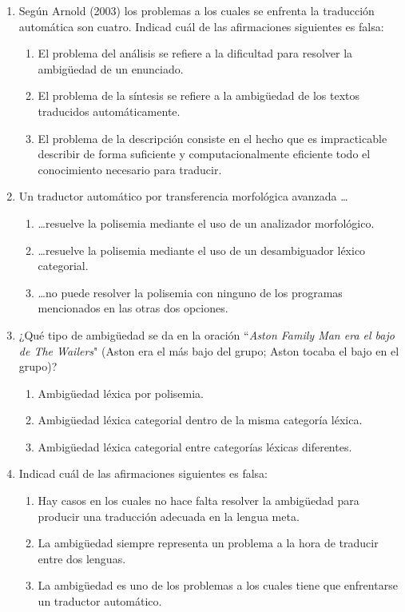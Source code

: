 \begin{enumerate}
\item Según Arnold (2003) los problemas a los cuales se enfrenta la traducción automática son cuatro. Indicad cuál de las afirmaciones siguientes es falsa: \begin{enumerate} \item El problema del análisis se refiere a la dificultad para resolver la ambigüedad de un enunciado. \item El problema de la síntesis se refiere a la ambigüedad de los textos traducidos automáticamente. \item El problema de la descripción consiste en el hecho que es impracticable describir de forma suficiente y computacionalmente eficiente todo el conocimiento necesario para traducir. \end{enumerate} 

\item Un traductor automático por transferencia morfológica avanzada \ldots \begin{enumerate} \item \ldots resuelve la polisemia mediante el uso de un analizador morfológico. \item \ldots resuelve la polisemia mediante el uso de un desambiguador léxico categorial. \item \ldots no puede resolver la polisemia con ninguno de los programas mencionados en las otras dos opciones. \end{enumerate} 

\item ¿Qué tipo de ambigüedad se da en la oración ``\emph{Aston Family Man era el bajo de The Wailers}" (Aston era el más bajo del grupo; Aston tocaba el bajo en el grupo)? \begin{enumerate} \item Ambigüedad léxica por polisemia. \item Ambigüedad léxica categorial dentro de la misma categoría léxica. \item Ambigüedad léxica categorial entre categorías léxicas diferentes. \end{enumerate} 

\item Indicad cuál de las afirmaciones siguientes es falsa: \begin{enumerate} \item Hay casos en los cuales no hace falta resolver la ambigüedad para producir una traducción adecuada en la lengua meta. \item La ambigüedad siempre representa un problema a la hora de traducir entre dos lenguas. \item La ambigüedad es uno de los problemas a los cuales tiene que enfrentarse un traductor automático. \end{enumerate} \end{enumerate} 

